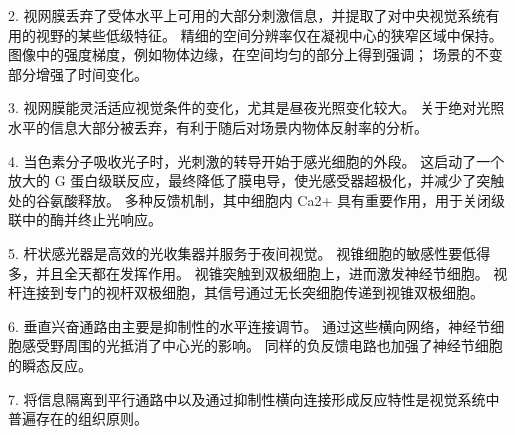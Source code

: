 2. 视网膜丢弃了受体水平上可用的大部分刺激信息，并提取了对中央视觉系统有用的视野的某些低级特征。 
精细的空间分辨率仅在凝视中心的狭窄区域中保持。 
图像中的强度梯度，例如物体边缘，在空间均匀的部分上得到强调；
场景的不变部分增强了时间变化。 


3. 视网膜能灵活适应视觉条件的变化，尤其是昼夜光照变化较大。 
关于绝对光照水平的信息大部分被丢弃，有利于随后对场景内物体反射率的分析。 


4. 当色素分子吸收光子时，光刺激的转导开始于感光细胞的外段。 
这启动了一个放大的 G 蛋白级联反应，最终降低了膜电导，使光感受器超极化，并减少了突触处的谷氨酸释放。 
多种反馈机制，其中细胞内 Ca2+ 具有重要作用，用于关闭级联中的酶并终止光响应。 


5. 杆状感光器是高效的光收集器并服务于夜间视觉。 
视锥细胞的敏感性要低得多，并且全天都在发挥作用。 
视锥突触到双极细胞上，进而激发神经节细胞。 
视杆连接到专门的视杆双极细胞，其信号通过无长突细胞传递到视锥双极细胞。 


6. 垂直兴奋通路由主要是抑制性的水平连接调节。 
通过这些横向网络，神经节细胞感受野周围的光抵消了中心光的影响。
同样的负反馈电路也加强了神经节细胞的瞬态反应。 

7. 将信息隔离到平行通路中以及通过抑制性横向连接形成反应特性是视觉系统中普遍存在的组织原则。



